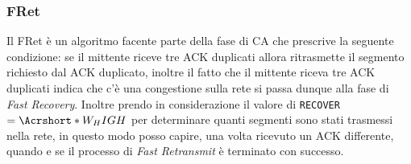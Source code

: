         \subsubsection{\acrfull*{FRet}}
            Il \Acrlong*{FRet} è un algoritmo facente parte della fase di \Acrlong*{CA} che prescrive la seguente condizione: se il mittente riceve tre \Acrshort*{ACK} duplicati allora ritrasmette il segmento richiesto dal \Acrshort*{ACK} duplicato, inoltre il fatto che il mittente riceva tre \Acrshort*{ACK} duplicati indica che c'è una congestione sulla rete si passa dunque alla fase di \textit{Fast Recovery}. Inoltre prendo in considerazione il valore di \texttt{RECOVER}$=\Acrshort*{W_HIGH}$ per determinare quanti segmenti sono stati trasmessi nella rete, in questo modo posso capire, una volta ricevuto un \Acrshort*{ACK} differente, quando e se il processo di \textit{Fast Retransmit} è terminato con successo.
